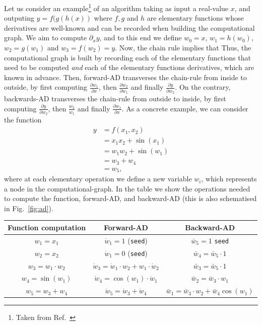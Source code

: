Let us consider an example\footnote{Taken from Ref.~\cite{wikiAD}} of an algorithm taking as input a real-value $x$, and outputing $y = f(g(h(x))$ where $f,g$ and $h$ are elementary functions whose derivatives are well-known and can be recorded when building the computational graph. We aim to compute $\partial_x y$, and to this end we define $w_0 = x$, $w_1 = h(w_0)$, $w_2 = g(w_1)$ and $w_3 = f(w_2) = y$. Now, the chain rule implies that
 Thus, the computational graph is built by recording each of the elementary functions that need to be computed \textit{and} each of the elementary functions derivatives, which are known in advance. Then, forward-AD transverses the chain-rule from inside to outside, by first computing $\frac{\partial w_1}{\partial x}$, then $\frac{\partial w_2}{\partial w_1}$ and finally $\frac{\partial y}{\partial w_2}$.
On the contrary, backwards-AD transverses the chain-rule from outside to inside, by first computing $\frac{\partial y}{\partial w_2}$, then $\frac{w_2}{w_1}$ and finally $\frac{\partial w_1}{\partial x}$. As a concrete example, we can consider the function
\begin{align}
y &= f(x_1, x_2) \\
&= x_1 x_2 + \sin(x_1) \\ 
&= w_1 w_2 + \sin(w_1) \\
&= w_3 + w_4 \\
&= w_5,
\end{align}
where at each elementary operation we define a new variable $w_i$, which represents a node in the computational-graph. In the table we show the operations needed to compute the function, forward-AD, and backward-AD (this is also schematised in Fig.~\ref{fig:ad}).
\begin{center}
\begin{tabular}{| c |c |c |}
\hline
Function computation  &  Forward-AD&  Backward-AD\\
\hline
  $w_1 = x_1$&  $\dot{w}_1 = 1$ (\texttt{seed})&  $\bar{w}_5 = 1$ \texttt{seed}\\
  \hline
  $w_2 = x_2 $&  $\dot{w}_1 = 0$ (\texttt{seed})&  $\bar{w}_4 = \bar{w}_5 \cdot 1$\\
  \hline
  $w_3 = w_1\cdot w_2$& $\dot{w}_3 = \dot{w}_1\cdot w_2+ w_1 \cdot \dot{w}_2$ &  $\bar{w}_3 = \bar{w}_5 \cdot 1$\\
  \hline
  $w_4 = \sin(w_1)$& $\dot{w}_4 = \cos(w_1)\cdot \dot{w}_1$  &  $\bar{w}_2 = \bar{w}_3 \cdot w_1$\\
  \hline
  $w_5 = w_3 + w_4$& $\dot{w}_5 = \dot{w}_3 + \dot{w}_4$ &  $\bar{w}_1 = \bar{w}_3 \cdot w_2 + \bar{w}_4 \cos(w_1)$\\
  \hline
\end{tabular}
\end{center}
